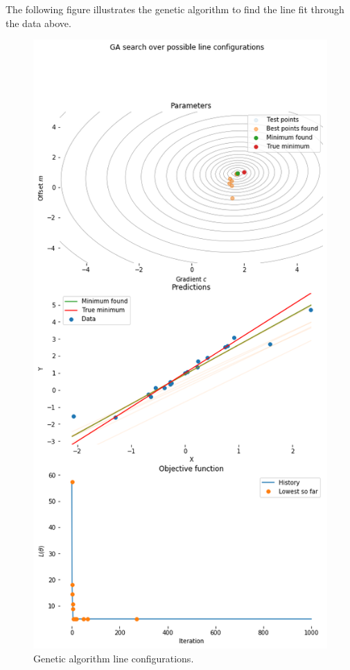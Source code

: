 \documentclass[a4paper, openany]{memoir}
\begin{document}
The following figure illustrates the genetic algorithm to find the line fit through the data above.
\begin{figure}[H]
    \centering
    \includegraphics[scale=0.5]{src/4.20 genetic algorithm line configurations.png}
    \caption{Genetic algorithm line configurations.}
\end{figure}
\end{document}
